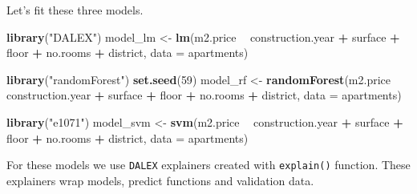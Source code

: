\documentclass[12pt,]{krantz}
\newenvironment{Shaded}{\begin{snugshade}}{\end{snugshade}}
\newcommand{\DataTypeTok}[1]{\textcolor[rgb]{0.13,0.29,0.53}{#1}}
\newcommand{\DecValTok}[1]{\textcolor[rgb]{0.00,0.00,0.81}{#1}}
\newcommand{\KeywordTok}[1]{\textcolor[rgb]{0.13,0.29,0.53}{\textbf{#1}}}
\newcommand{\NormalTok}[1]{#1}
\newcommand{\OperatorTok}[1]{\textcolor[rgb]{0.81,0.36,0.00}{\textbf{#1}}}
\newcommand{\StringTok}[1]{\textcolor[rgb]{0.31,0.60,0.02}{#1}}
\theoremstyle{definition}
\theoremstyle{definition}
\theoremstyle{definition}
\theoremstyle{remark}
\begin{document}
Let's fit these three models.

\begin{Shaded}
\begin{Highlighting}[]
\KeywordTok{library}\NormalTok{(}\StringTok{"DALEX"}\NormalTok{)}
\NormalTok{model_lm <-}\StringTok{ }\KeywordTok{lm}\NormalTok{(m2.price }\OperatorTok{~}\StringTok{ }\NormalTok{construction.year }\OperatorTok{+}\StringTok{ }\NormalTok{surface }\OperatorTok{+}\StringTok{ }\NormalTok{floor }\OperatorTok{+}\StringTok{ }
\StringTok{                      }\NormalTok{no.rooms }\OperatorTok{+}\StringTok{ }\NormalTok{district, }\DataTypeTok{data =}\NormalTok{ apartments)}

\KeywordTok{library}\NormalTok{(}\StringTok{"randomForest"}\NormalTok{)}
\KeywordTok{set.seed}\NormalTok{(}\DecValTok{59}\NormalTok{)}
\NormalTok{model_rf <-}\StringTok{ }\KeywordTok{randomForest}\NormalTok{(m2.price }\OperatorTok{~}\StringTok{ }\NormalTok{construction.year }\OperatorTok{+}\StringTok{ }\NormalTok{surface }\OperatorTok{+}\StringTok{ }\NormalTok{floor }\OperatorTok{+}\StringTok{ }
\StringTok{                      }\NormalTok{no.rooms }\OperatorTok{+}\StringTok{ }\NormalTok{district, }\DataTypeTok{data =}\NormalTok{ apartments)}

\KeywordTok{library}\NormalTok{(}\StringTok{"e1071"}\NormalTok{)}
\NormalTok{model_svm <-}\StringTok{ }\KeywordTok{svm}\NormalTok{(m2.price }\OperatorTok{~}\StringTok{ }\NormalTok{construction.year }\OperatorTok{+}\StringTok{ }\NormalTok{surface }\OperatorTok{+}\StringTok{ }\NormalTok{floor }\OperatorTok{+}\StringTok{ }
\StringTok{                         }\NormalTok{no.rooms }\OperatorTok{+}\StringTok{ }\NormalTok{district, }\DataTypeTok{data =}\NormalTok{ apartments)}
\end{Highlighting}
\end{Shaded}

For these models we use \texttt{DALEX} explainers created with
\texttt{explain()} function. These explainers wrap models, predict
functions and validation data.

\begin{Shaded}
\end{Shaded}
\end{document}

